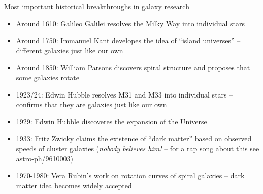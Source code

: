 \documentclass[letterpaper,landscape]{slides}
\begin{document}
\begin{slide}
\begin{center}
{\large \color{red} 
                   Most important historical breakthroughs in galaxy research }
\end{center}

\begin{itemize}
\item Around 1610: Galileo Galilei resolves the Milky Way into individual stars 
\item Around 1750: Immanuel Kant developes the idea of ``island universes'' -- different
    galaxies just like our own
\item Around 1850: William Parsons discovers spiral structure and proposes that some galaxies
                 rotate
\item 1923/24: Edwin Hubble resolves M31 and M33 into individual stars -- confirms
   that they are galaxies just like our own
\item 1929: Edwin Hubble discoveres the expansion of the Universe
\item 1933: Fritz Zwicky claims the existence of ``dark matter'' based on observed speeds
     of cluster galaxies ({\it nobody believes him!} -- for a rap song about this see
     astro-ph/9610003)
\item 1970-1980: Vera Rubin's work on rotation curves of spiral galaxies -- dark matter idea
   becomes widely accepted
\end{itemize}     
     
\vfill
\end{slide}
\end{document}
